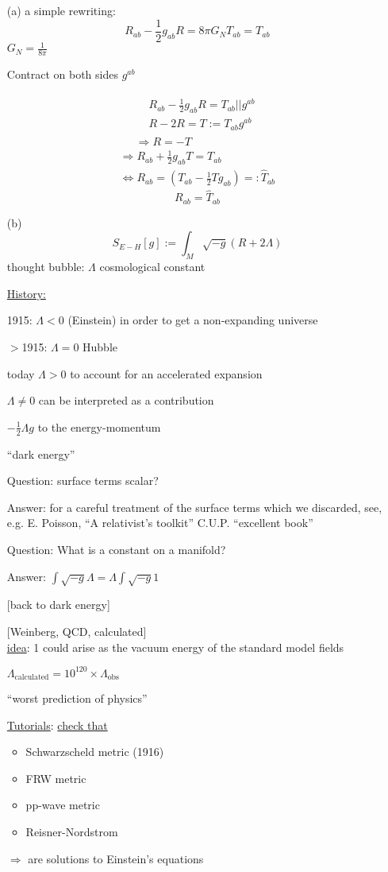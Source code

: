 \begin{enumerate}
\item[(a)] a simple rewriting:
\[
R_{ab} - \frac{1}{2} g_{ab} R = 8 \pi G_N T_{ab} = T_{ab}
\]
$G_N = \frac{1}{8\pi}$

Contract on both sides $g^{ab}$

\[
\begin{gathered}
\begin{aligned}
  & R_{ab} - \frac{1}{2} g_{ab} R = T_{ab} || g^{ab} \\ 
  & R - 2R = T := T_{ab}g^{ab}
\end{aligned} \\
\Longrightarrow R = -T
\end{gathered}
\]
\[
\begin{gathered}
\Longrightarrow R_{ab} + \frac{1}{2} g_{ab} T = T_{ab} \\
\Longleftrightarrow R_{ab} = (T_{ab} - \frac{1}{2} Tg_{ab}) =: \widehat{T}_{ab}
\end{gathered}
\]
\[
\boxed{ R_{ab} = \widehat{T}_{ab}}
\]

\item[(b)] \[
S_{E-H}[g] := \int_M \sqrt{-g} (R+ 2\Lambda)
\]
thought bubble: $\Lambda$ cosmological constant

\underline{History:}

1915: $\Lambda < 0$ (Einstein) in order to get a non-expanding universe

$>$1915: $\Lambda =0$ Hubble 

today $\Lambda > 0$ to account for an accelerated expansion

$\Lambda \neq 0$ can be interpreted as a contribution

$-\frac{1}{2} \Lambda g$ to the energy-momentum 

``dark energy''

Question: surface terms scalar?

Answer: for a careful treatment of the surface terms which we discarded, see, e.g. E. Poisson, ``A relativist's toolkit'' C.U.P. ``excellent book''

Question: What is a constant on a manifold?

Answer: $\int \sqrt{-g} \Lambda = \Lambda \int \sqrt{-g} 1$

[back to dark energy]

[Weinberg, QCD, calculated] \\
\underline{idea}: 1 could arise as the vacuum energy of the standard model fields 

$\Lambda_{\text{calculated}} = 10^{120} \times \Lambda_{\text{obs}}$

``worst prediction of physics''

\underline{Tutorials}: \underline{check that }
\begin{itemize}
\item Schwarzscheld metric (1916)
\item FRW metric 
\item pp-wave metric 
\item Reisner-Nordstrom 
\end{itemize}
$\Longrightarrow $ are solutions to Einstein's equations
\end{enumerate}

